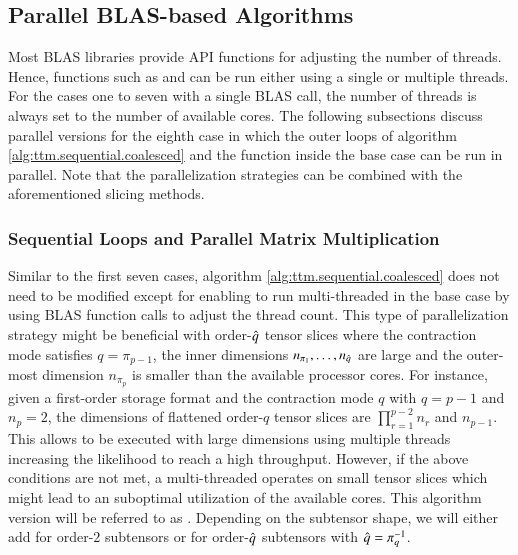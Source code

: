 



 
\subsection{Parallel BLAS-based Algorithms}
\label{subsec:parallel.multi-loops}
Most BLAS libraries provide API functions for adjusting the number of threads.
Hence, functions such as  and  can be run either using a single or multiple threads.
For the cases one to seven with a single BLAS call, the number of threads is always set to the number of available cores.
The following subsections discuss parallel versions for the eighth case in which the outer loops of algorithm \ref{alg:ttm.sequential.coalesced} and the  function inside the base case can be run in parallel.
Note that the parallelization strategies can be combined with the aforementioned slicing methods.

\subsubsection{Sequential Loops and Parallel Matrix Multiplication}
Similar to the first seven cases, algorithm \ref{alg:ttm.sequential.coalesced} does not need to be modified except for enabling  to run multi-threaded in the base case by using BLAS function calls to adjust the thread count.
This type of parallelization strategy might be beneficial with order-$\hat{q}$ tensor slices where the contraction mode satisfies $q = \pi_{p-1}$, the inner dimensions $n_{\pi_1},\dots,n_{\hat{q}}$ are large and the outer-most dimension $n_{\pi_{p}}$ is smaller than the available processor cores.
For instance, given a first-order storage format and the contraction mode $q$ with $q=p-1$ and $n_p=2$, the dimensions of flattened order-$q$ tensor slices are $\prod_{r=1}^{p-2}n_r$ and $n_{p-1}$.
This allows  to be executed with large dimensions using multiple threads increasing the likelihood to reach a high throughput.
However, if the above conditions are not met, a multi-threaded  operates on small tensor slices which might lead to an suboptimal utilization of the available cores.
This algorithm version will be referred to as .
Depending on the subtensor shape, we will either add  for order-$2$ subtensors or  for order-$\hat{q}$ subtensors with $\hat{q} = \pi^{-1}_q$.


